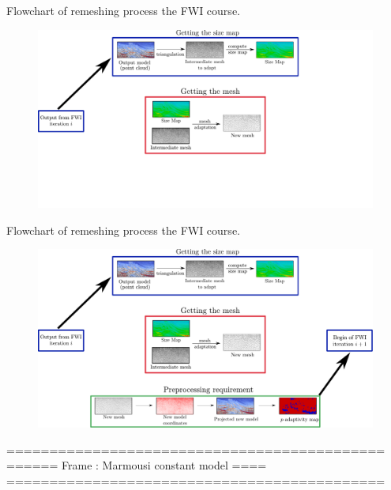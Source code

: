 \begin{frame}[noframenumbering]{Flowchart of remeshing process the FWI course.}

  \begin{figure}[htbp!]
    \vspace{-0.7cm}
  \centering
  \includegraphics[scale=0.36]{image/remesh_workflow2.pdf}
  \label{flowchart_remesh}
\end{figure}
\end{frame}


\begin{frame}[noframenumbering]{Flowchart of remeshing process the FWI course.}

  \begin{figure}[htbp!]
    \vspace{-0.7cm}
  \centering
  \includegraphics[scale=0.36]{image/remesh_workflow.pdf}
  \label{flowchart_remesh}
\end{figure}
\end{frame}




============================================
====== Frame :  Marmousi constant model ====
============================================

